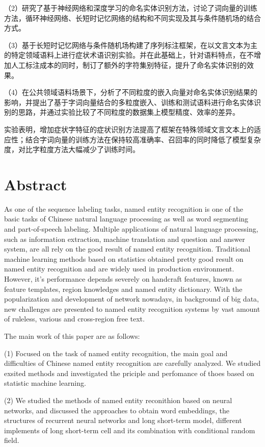 （2）研究了基于神经网络和深度学习的命名实体识别方法，讨论了词向量的训练方法，循环神经网络、长短时记忆网络的结构和不同实现及其与条件随机场的结合方式。

（3）基于长短时记忆网络与条件随机场构建了序列标注框架，在以文言文本为主的特定领域语料上进行症状术语识别实验。并在此基础上，针对语料特点，在不增加人工标注成本的同时，制订了额外的字符集别特征，提升了命名实体识别的效果。

（4）在公共领域语料场景下，分析了不同粒度的嵌入向量对命名实体识别结果的影响，并提出了基于字词向量结合的多粒度嵌入、训练和测试语料进行命名实体识别的思路，并通过实验比较了不同粒度的数据集上模型精度、效率的差异。

实验表明，增加症状字特征的症状识别方法提高了框架在特殊领域文言文本上的适应性；结合字词向量的训练方法在保持较高准确率、召回率的同时降低了模型复杂度，对比字粒度方法大幅减少了训练时间。\\
\chapter{Abstract}
As one of the sequence labeling tasks, named entity recognition is one of the basic tasks of Chinese natural language processing as well as word segmenting and part-of-speech labeling.
Multiple applications of natural language processing, such as information extraction, machine translation and question and answer system, are all rely on the good result of named entity recognition.
Traditional machine learning methods based on statistics obtained pretty good result on named entity recognition and are widely used in production environment.
However, it's performance depends severely on handcraft features, known as feature templates, region knowledges and named entity dictionary.
With the popularization and development of network nowadays, in background of big data, new challenges are presented to named entity recognition systems by vast amount of ruleless, various and cross-region free text.

The main work of this paper are as follows:

(1) Focused on the task of named entity recognition, the main goal and difficulties of Chinese named entity recognition are carefully analyzed. We studied exsited methods and investigated the priciple and perfomance of thoes based on statistic machine learning.

(2) We studied the methods of named entity reconithion based on neural networks, and discussed the approaches to obtain word embeddings, the structures of recurrent neural networks and long short-term model, different implements of long short-term cell and its combination with conditional random field.

